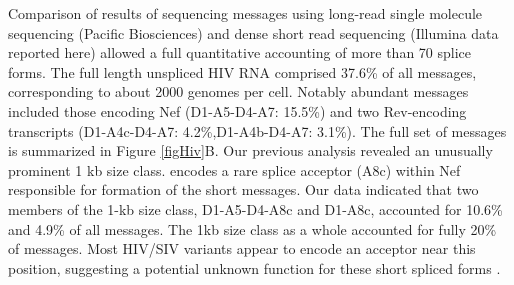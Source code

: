 \documentclass[../sherrill-Mix_thesis.tex]{subfiles}
\begin{document}
	Comparison of results of sequencing \hivEight{} messages using long-read single molecule sequencing (Pacific Biosciences) and dense short read sequencing (Illumina data reported here) allowed a full quantitative accounting of more than 70 \hivEight{} splice forms.  The full length unspliced HIV RNA comprised 37.6\% of all messages, corresponding to about 2000 genomes per cell. Notably abundant messages included those encoding Nef (D1-A5-D4-A7: 15.5\%) and two Rev-encoding transcripts (D1-A4c-D4-A7: 4.2\%,D1-A4b-D4-A7: 3.1\%).  The full set of messages is summarized in Figure \ref{figHiv}B. Our previous analysis revealed an unusually prominent 1 kb size class. \hivEight{} encodes a rare splice acceptor (A8c) within Nef responsible for formation of the short messages.  Our data indicated that two members of the 1-kb size class, D1-A5-D4-A8c and D1-A8c, accounted for 10.6\% and 4.9\% of all messages. The  1kb size class as a whole accounted for fully 20\% of messages. Most HIV/SIV variants appear to encode an acceptor near this position, suggesting a potential unknown function for these short spliced forms \citep{Smith1992,Carrera2010,Ocwieja2012}.
\end{document}
